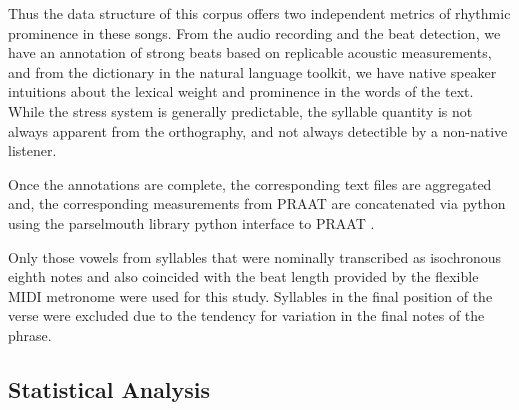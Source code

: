 Thus the data structure of this corpus offers two independent metrics of rhythmic prominence in these songs. From the audio recording and the beat detection, we have an annotation of strong beats based on replicable acoustic measurements, and from the dictionary in the natural language toolkit, we have native speaker intuitions about the lexical weight and prominence in the words of the text. While the stress system is generally predictable, the syllable quantity is not always apparent from the orthography, and not always detectible by a non-native listener. 



Once the annotations are complete, the corresponding text files are aggregated and, the corresponding measurements from PRAAT are concatenated via python using the parselmouth library python interface to PRAAT \citep{parselmouth2018, python1995}. 

Only those vowels from syllables that were nominally transcribed as isochronous eighth notes and also coincided with the beat length provided by the flexible MIDI metronome were used for this study.  Syllables in the final position of the verse were excluded due to the tendency for variation in the final notes of the phrase. 


\subsection{Statistical Analysis} 
%
%
%
%
%
